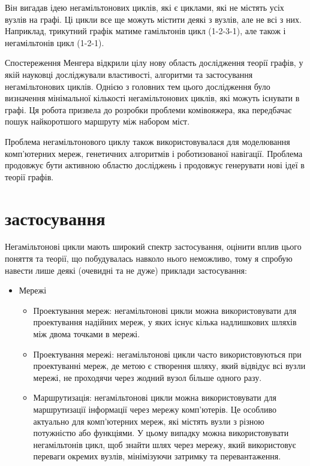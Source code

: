 \documentclass[14pt]{article}
\begin{document}
\begin{spacing}{1.175}
        Він вигадав ідею негамільтонових циклів, які є циклами, які не містять усіх вузлів на графі. Ці цикли все ще можуть містити деякі з вузлів, але не всі з них. Наприклад, трикутний графік матиме гамільтонів цикл (1-2-3-1), але також і негамільтонів цикл (1-2-1).

        Спостереження Менгера відкрили цілу нову область дослідження теорії графів, у якій науковці досліджували властивості, алгоритми та застосування негамільтонових циклів. Однією з головних тем цього дослідження було визначення мінімальної кількості негамільтонових циклів, які можуть існувати в графі. Ця робота призвела до розробки проблеми комівояжера, яка передбачає пошук найкоротшого маршруту між набором міст.

        Проблема негамільтонового циклу також використовувалася для моделювання комп’ютерних мереж, генетичних алгоритмів і роботизованої навігації. Проблема продовжує бути активною областю досліджень і продовжує генерувати нові ідеї в теорії графів.
    
    \section{ застосування}
    Негамільтонові цикли мають широкий спектр застосування, оцінити вплив цього поняття та теорії, що побудувалась навколо нього неможливо, тому я спробую навести лише деякі (очевидні та не дуже) приклади застосування:
    \begin{itemize}
       
        \item Мережі
        \begin{itemize}
            
            \item Проектування мереж: негамільтонові цикли можна використовувати для проектування надійних мереж, у яких існує кілька надлишкових шляхів між двома точками в мережі.
        
            \item Проектування мережі: негамільтонові цикли часто використовуються при проектуванні мереж, де метою є створення шляху, який відвідує всі вузли мережі, не проходячи через жодний вузол більше одного разу.
        
            \item Маршрутизація: негамільтонові цикли можна використовувати для маршрутизації інформації через мережу комп’ютерів. Це особливо актуально для комп’ютерних мереж, які містять вузли з різною потужністю або функціями. У цьому випадку можна використовувати негамільтонів цикл, щоб знайти шлях через мережу, який використовує переваги окремих вузлів, мінімізуючи затримку та перевантаження.
        

\end{itemize}
\end{itemize}
\end{spacing}
\end{document}
